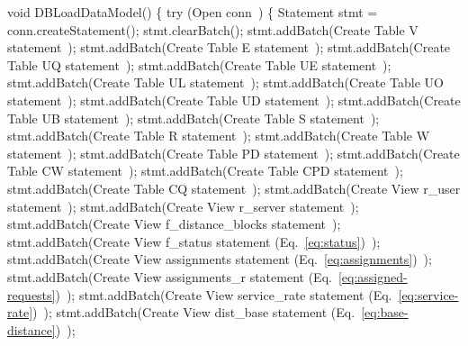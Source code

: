 void DBLoadDataModel() \{
  try (\LA{}Open \code{}conn\edoc{}~{\nwtagstyle{}}\RA{}) \{
    Statement stmt = conn.createStatement();
    stmt.clearBatch();
    stmt.addBatch(\LA{}Create Table V statement~{\nwtagstyle{}}\RA{});
    stmt.addBatch(\LA{}Create Table E statement~{\nwtagstyle{}}\RA{});
    stmt.addBatch(\LA{}Create Table UQ statement~{\nwtagstyle{}}\RA{});
    stmt.addBatch(\LA{}Create Table UE statement~{\nwtagstyle{}}\RA{});
    stmt.addBatch(\LA{}Create Table UL statement~{\nwtagstyle{}}\RA{});
    stmt.addBatch(\LA{}Create Table UO statement~{\nwtagstyle{}}\RA{});
    stmt.addBatch(\LA{}Create Table UD statement~{\nwtagstyle{}}\RA{});
    stmt.addBatch(\LA{}Create Table UB statement~{\nwtagstyle{}}\RA{});
    stmt.addBatch(\LA{}Create Table S statement~{\nwtagstyle{}}\RA{});
    stmt.addBatch(\LA{}Create Table R statement~{\nwtagstyle{}}\RA{});
    stmt.addBatch(\LA{}Create Table W statement~{\nwtagstyle{}}\RA{});
    stmt.addBatch(\LA{}Create Table PD statement~{\nwtagstyle{}}\RA{});
    stmt.addBatch(\LA{}Create Table CW statement~{\nwtagstyle{}}\RA{});
    stmt.addBatch(\LA{}Create Table CPD statement~{\nwtagstyle{}}\RA{});
    stmt.addBatch(\LA{}Create Table CQ statement~{\nwtagstyle{}}\RA{});
    stmt.addBatch(\LA{}Create View r\_user statement~{\nwtagstyle{}}\RA{});
    stmt.addBatch(\LA{}Create View r\_server statement~{\nwtagstyle{}}\RA{});
    stmt.addBatch(\LA{}Create View f\_distance\_blocks statement~{\nwtagstyle{}}\RA{});
    stmt.addBatch(\LA{}Create View f\_status statement (Eq.~\ref{eq:status})~{\nwtagstyle{}}\RA{});
    stmt.addBatch(\LA{}Create View assignments statement (Eq.~\ref{eq:assignments})~{\nwtagstyle{}}\RA{});
    stmt.addBatch(\LA{}Create View assignments\_r statement (Eq.~\ref{eq:assigned-requests})~{\nwtagstyle{}}\RA{});
    stmt.addBatch(\LA{}Create View service\_rate statement (Eq.~\ref{eq:service-rate})~{\nwtagstyle{}}\RA{});
    stmt.addBatch(\LA{}Create View dist\_base statement (Eq.~\ref{eq:base-distance})~{\nwtagstyle{}}\RA{});
